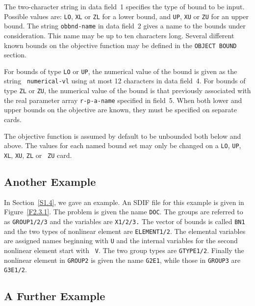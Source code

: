\documentclass[a4paper]{article}
\begin{document}
The two-character string in data  field~1 specifies  the type of bound
to  be input. Possible values  are: {\tt LO}, {\tt XL}   or {\tt ZL} for a
lower bound,  and {\tt UP}, {\tt XU}  or {\tt ZU}  for an upper bound.
The string {\tt obbnd-name} in data field~2 gives a name to the bounds
under consideration.   This name may  be  up  to ten characters  long.
Several different  known  bounds  on the objective  function
may  be defined in the {\tt OBJECT BOUND} section.

For bounds of type {\tt LO}  or  {\tt  UP},
the   numerical value  of   the  bound  is  given as the  string  {\tt
numerical\--\-vl}  using at most  12 characters in  data field~4.  For
bounds of type {\tt ZL} or {\tt ZU},
the numerical  value of the bound
is  that  previously  associated with  the real  parameter  array
{\tt r-p-a-name} specified in field~5.  When both lower and upper
bounds
on the objective are known, they must be specified on separate cards.

The  objective function
is  assumed by  default to be  unbounded both
below  and above.  The values  for  each named bound set  may  only be
changed on a {\tt LO}, {\tt UP}, {\tt XL}, {\tt XU}, {\tt  ZL} or {\tt
ZU} card.

\subsection{\label{S2.3}Another Example}

In  Section~\ref{S1.4},  we  gave an  example. An SDIF  file for  this
example is given in Figure~\ref{F2.3.1}. The problem is given the name
{\tt DOC}.  The groups
are referred to  as  {\tt GROUP1/2/3}  and  the
variables  are {\tt X1/2/3.} The vector  of bounds
is called {\tt BN1}
and the  two types of  nonlinear   element
are {\tt  ELEMENT1/2}. The
elemental variables
are assigned names beginning with {\tt U}  and the
internal  variables
for the second  nonlinear  element start with {\tt
V}.  The two group types
are  {\tt GTYPE1/2}.  Finally the nonlinear
element in {\tt GROUP2} is given the name  {\tt G2E1},  while those in
{\tt GROUP3} are {\tt G3E1/2}.


\subsection{\label{S2.4}A Further Example}
\end{document}
